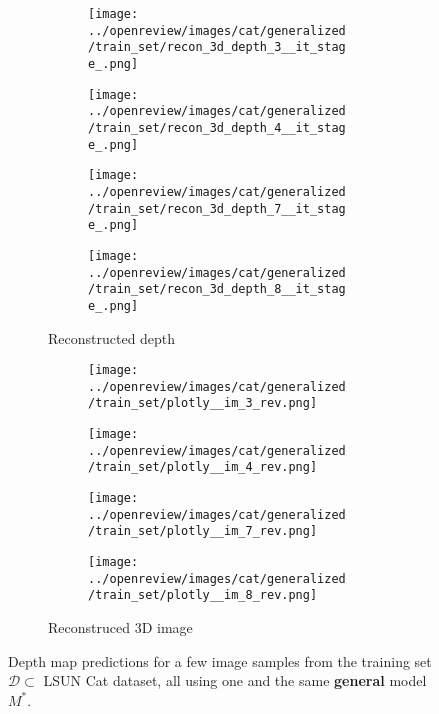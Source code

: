 \begin{figure}[!htb]
\begin{subfigure}{\textwidth}
    \begin{subfigure}{0.24\textwidth}
    \centering
    \texttt{[image: ../openreview/images/cat/generalized/train\_set/recon\_3d\_depth\_3\_\_it\_stage\_.png]}
\end{subfigure}
\begin{subfigure}{0.24\textwidth}
    \centering
    \texttt{[image: ../openreview/images/cat/generalized/train\_set/recon\_3d\_depth\_4\_\_it\_stage\_.png]}
\end{subfigure}
\begin{subfigure}{0.24\textwidth}
    \centering
    \texttt{[image: ../openreview/images/cat/generalized/train\_set/recon\_3d\_depth\_7\_\_it\_stage\_.png]}
\end{subfigure}
\begin{subfigure}{0.24\textwidth}
    \centering
    \texttt{[image: ../openreview/images/cat/generalized/train\_set/recon\_3d\_depth\_8\_\_it\_stage\_.png]}
\end{subfigure}
    \caption{Reconstructed depth}
\end{subfigure}
\begin{subfigure}{\textwidth}
    \begin{subfigure}{0.24\textwidth}
    \centering
    \texttt{[image: ../openreview/images/cat/generalized/train\_set/plotly\_\_im\_3\_rev.png]}
\end{subfigure}
\begin{subfigure}{0.24\textwidth}
    \centering
    \texttt{[image: ../openreview/images/cat/generalized/train\_set/plotly\_\_im\_4\_rev.png]}
\end{subfigure}
\begin{subfigure}{0.24\textwidth}
    \centering
    \texttt{[image: ../openreview/images/cat/generalized/train\_set/plotly\_\_im\_7\_rev.png]}
\end{subfigure}
\begin{subfigure}{0.24\textwidth}
    \centering
    \texttt{[image: ../openreview/images/cat/generalized/train\_set/plotly\_\_im\_8\_rev.png]}
    
\end{subfigure}
\caption{Reconstruced 3D image}
\end{subfigure}
    \caption{Depth map predictions for a few image samples from the training set $\mathcal{D} \subset$ LSUN Cat dataset, all using one and the same  \textbf{general} model $M^*$.}
    \label{fig:gen_LSUN_Cat_train}
\end{figure}

